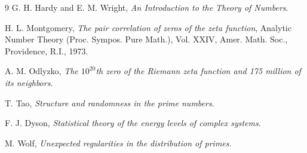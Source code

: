\documentclass[12pt]{article}
\begin{document}
\begin{thebibliography}{9}
G. H. Hardy and E. M. Wright, \textit{An Introduction to the Theory of Numbers}.

H. L. Montgomery, \textit{The pair correlation of zeros of the zeta function}, Analytic Number Theory (Proc. Sympos. Pure Math.), Vol. XXIV, Amer. Math. Soc., Providence, R.I., 1973.

A. M. Odlyzko, \textit{The $10^{20}$th zero of the Riemann zeta function and 175 million of its neighbors}.

T. Tao, \textit{Structure and randomness in the prime numbers}.

F. J. Dyson, \textit{Statistical theory of the energy levels of complex systems}.

M. Wolf, \textit{Unexpected regularities in the distribution of primes}.
\end{thebibliography}
\end{document}

